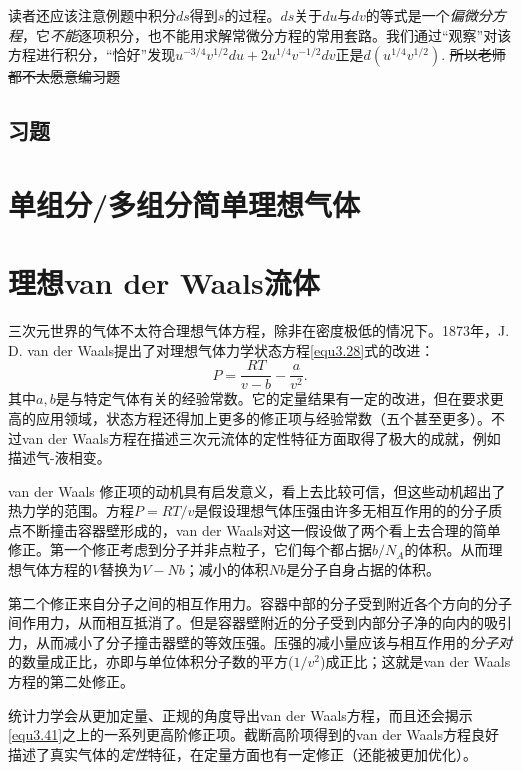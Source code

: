 读者还应该注意例题中积分$ds$得到$s$的过程。$ds$关于$du$与$dv$的等式是一个{\it 偏微分方程}，它{\it 不能}逐项积分，也不能用求解常微分方程的常用套路。我们通过“观察”对该方程进行积分，“恰好”发现$u^{-3/4} v^{1/2} du + 2u^{1/4} v^{-1/2} dv$正是$d(u^{1/4} v^{1/2})$. \sout{所以老师都不太愿意编习题}

\subsection*{习题}


\section{单组分/多组分简单理想气体}
\label{sec3.4}

\section{理想van der Waals流体}
\label{sec3.5}
三次元世界的气体不太符合理想气体方程，除非在密度极低的情况下。1873年，J. D. van der Waals提出了对理想气体力学状态方程\eqref{equ3.28}式的改进：
\begin{equation}
    P = \frac{RT}{v - b} - \frac{a}{v^2}.
\label{equ3.41}
\end{equation}
其中$a, b$是与特定气体有关的经验常数。它的定量结果有一定的改进，但在要求更高的应用领域，状态方程还得加上更多的修正项与经验常数（五个甚至更多）。不过van der Waals方程在描述三次元流体的定性特征方面取得了极大的成就，例如描述气-液相变。

van der Waals 修正项的动机具有启发意义，看上去比较可信，但这些动机超出了热力学的范围。方程$P = RT/v$是假设理想气体压强由许多无相互作用的的分子质点不断撞击容器壁形成的，van der Waals对这一假设做了两个看上去合理的简单修正。第一个修正考虑到分子并非点粒子，它们每个都占据$b/N_A$的体积。从而理想气体方程的$V$替换为$V - Nb$；减小的体积$Nb$是分子自身占据的体积。

第二个修正来自分子之间的相互作用力。容器中部的分子受到附近各个方向的分子间作用力，从而相互抵消了。但是容器壁附近的分子受到内部分子净的向内的吸引力，从而减小了分子撞击器壁的等效压强。压强的减小量应该与相互作用的{\it 分子对}的数量成正比，亦即与单位体积分子数的平方($1/v^2$)成正比；这就是van der Waals方程的第二处修正。

统计力学会从更加定量、正规的角度导出van der Waals方程，而且还会揭示\eqref{equ3.41}之上的一系列更高阶修正项。截断高阶项得到的van der Waals方程良好描述了真实气体的{\it 定性}特征，在定量方面也有一定修正（还能被更加优化）。

